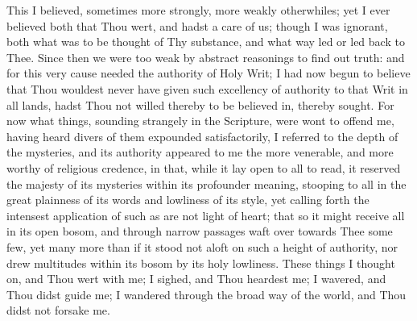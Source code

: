 \documentclass[b5paper,openright,12pt,twoside]{book}
\begin{document}
This I believed, sometimes more strongly, more weakly otherwhiles; yet I
ever believed both that Thou wert, and hadst a care of us; though I was
ignorant, both what was to be thought of Thy substance, and what way led
or led back to Thee. Since then we were too weak by abstract reasonings
to find out truth: and for this very cause needed the authority of Holy
Writ; I had now begun to believe that Thou wouldest never have given
such excellency of authority to that Writ in all lands, hadst Thou not
willed thereby to be believed in, thereby sought. For now what things,
sounding strangely in the Scripture, were wont to offend me, having
heard divers of them expounded satisfactorily, I referred to the depth
of the mysteries, and its authority appeared to me the more venerable,
and more worthy of religious credence, in that, while it lay open to all
to read, it reserved the majesty of its mysteries within its profounder
meaning, stooping to all in the great plainness of its words and
lowliness of its style, yet calling forth the intensest application of
such as are not light of heart; that so it might receive all in its open
bosom, and through narrow passages waft over towards Thee some few, yet
many more than if it stood not aloft on such a height of authority, nor
drew multitudes within its bosom by its holy lowliness. These things
I thought on, and Thou wert with me; I sighed, and Thou heardest me; I
wavered, and Thou didst guide me; I wandered through the broad way of
the world, and Thou didst not forsake me.
\end{document}
